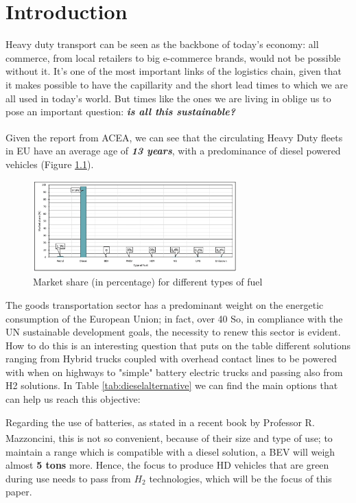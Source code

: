 \newpage
\chapter{Introduction}
Heavy duty transport can be seen as the backbone of today's economy: all commerce, from local retailers to big e-commerce brands, would not be possible without it.
It's one of the most important links of the logistics chain, given that it makes possible to have the capillarity and the short lead times to which we are all used in today's world.
But times like the ones we are living in oblige us to pose an important question: \textbf{\textit{is all this sustainable?}}

Given the report from ACEA\textsuperscript{\cite{ACEA2021}}, we can see that the circulating Heavy Duty fleets in EU have an average age of \textit{\textbf{13 years}}, with a predominance of diesel powered vehicles (Figure \ref{fig:hdpower}).
\begin{figure}[hb]
    \centering
    \includegraphics[width=0.7\textwidth]{Chapters/Pictures/Fuels_MarketShare.jpeg}
    \caption{Market share (in percentage) for different types of fuel}
    \label{fig:hdpower}
\end{figure}\textbf{}
The goods transportation sector has a predominant weight on the energetic consumption of the European Union; in fact, over 40 %
So, in compliance with the UN sustainable development goals, the  necessity to renew this sector is evident.
How to do this is an interesting question that puts on the table different solutions ranging from Hybrid trucks coupled with overhead contact lines to be powered with when on highways to "simple" battery electric trucks and passing also from H2 solutions.
In Table \ref{tab:dieselalternative} we can find the main options that can help us reach this objective:



Regarding the use of batteries, as stated in a recent book by Professor R. Mazzoncini\textsuperscript{\cite{Mazzo2021}}, this is not so convenient, because of their size and type of use; to maintain a range which is compatible with a diesel solution, a BEV will weigh almost \textbf{5 tons }more.
Hence, the focus to produce HD vehicles that are green during use needs to pass from $H_2$ technologies, which will be the focus of this paper.

